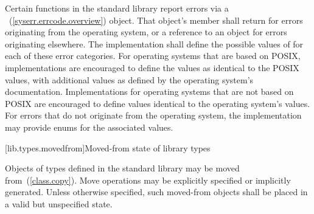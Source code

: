 \pnum
Certain functions in the \Cpp standard library report errors via a
~(\ref{syserr.errcode.overview}) object. That object's
 member shall return  for
errors originating from the operating system, or a reference to an
  object for errors originating elsewhere.
The implementation shall define the possible values of  for each of these
error categories. \enterexample For operating systems that are based on POSIX,
implementations are encouraged to define the  values as
identical to the POSIX  values, with additional values as defined by the
operating system's documentation. Implementations for operating systems that are not
based on POSIX are encouraged to define values identical to the operating system's
values. For errors that do not originate from the operating system, the implementation
may provide enums for the associated values. \exitexample

[lib.types.movedfrom]{Moved-from state of library types}

\pnum
Objects of types defined in the \Cpp standard library may be moved
from~(\ref{class.copy}). Move operations may be explicitly specified or
implicitly generated. Unless otherwise specified, such moved-from objects shall
be placed in a valid but unspecified state.
